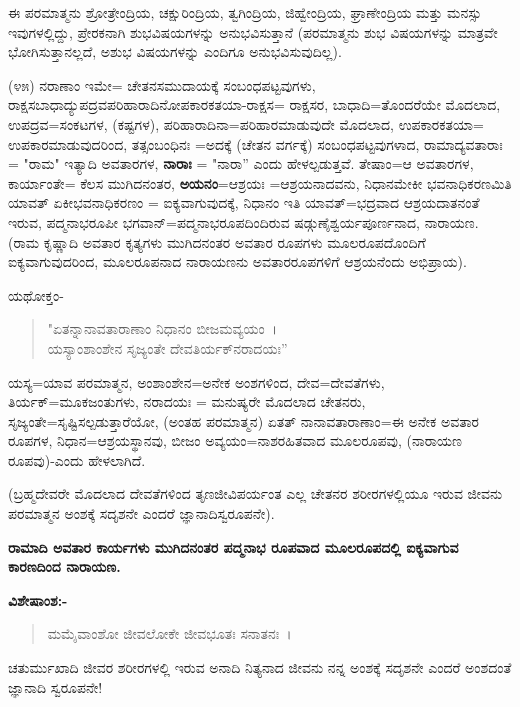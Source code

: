 
ಈ ಪರಮಾತ್ಮನು ಶ್ರೋತ್ರೇಂದ್ರಿಯ, ಚಕ್ಷುರಿಂದ್ರಿಯ, ತ್ವಗಿಂದ್ರಿಯ, ಜಿಹ್ವೇಂದ್ರಿಯ, ಘ್ರಾಣೇಂದ್ರಿಯ ಮತ್ತು ಮನಸ್ಸು ಇವುಗಳಲ್ಲಿದ್ದು, ಪ್ರೇರಕನಾಗಿ ಶುಭವಿಷಯಗಳನ್ನು ಅನುಭವಿಸುತ್ತಾನೆ (ಪರಮಾತ್ಮನು ಶುಭ ವಿಷಯಗಳನ್ನು ಮಾತ್ರವೇ ಭೋಗಿಸುತ್ತಾನಲ್ಲದೆ, ಅಶುಭ ವಿಷಯಗಳನ್ನು ಎಂದಿಗೂ ಅನುಭವಿಸುವುದಿಲ್ಲ).

(೪೫) ನರಾಣಾಂ ಇಮೇ= ಚೇತನಸಮುದಾಯಕ್ಕೆ ಸಂಬಂಧಪಟ್ಟವುಗಳು, ರಾಕ್ಷಸಬಾಧಾದ್ಯುಪದ್ರವಪರಿಹಾರಾದಿನೋಪಕಾರಕತಯಾ-ರಾಕ್ಷಸ= ರಾಕ್ಷಸರ, ಬಾಧಾದಿ=ತೊಂದರೆಯೇ ಮೊದಲಾದ, ಉಪದ್ರವ=ಸಂಕಟಗಳ, (ಕಷ್ಟಗಳ), ಪರಿಹಾರಾದಿನಾ=ಪರಿಹಾರಮಾಡುವುದೇ ಮೊದಲಾದ, ಉಪಕಾರಕತಯಾ= ಉಪಕಾರಮಾಡುವುದರಿಂದ, ತತ್ಸಂಬಂಧಿನಃ =ಅದಕ್ಕೆ (ಚೇತನ ವರ್ಗಕ್ಕೆ) ಸಂಬಂಧಪಟ್ಟವುಗಳಾದ, ರಾಮಾದ್ಯವತಾರಾಃ = "ರಾಮ" ಇತ್ಯಾದಿ ಅವತಾರಗಳ, \textbf{ನಾರಾಃ} = "ನಾರಾ'' ಎಂದು ಹೇಳಲ್ಪಡುತ್ತವೆ. ತೇಷಾಂ=ಆ ಅವತಾರಗಳ, ಕಾರ್ಯಾಂತೇ= ಕೆಲಸ ಮುಗಿದನಂತರ, \textbf{ಅಯನಂ}=ಆಶ್ರಯಃ =ಆಶ್ರಯನಾದವನು, ನಿಧಾನಮೇಕೀ ಭವನಾಧಿಕರಣಮಿತಿ ಯಾವತ್‌ ಏಕೀಭವನಾಧಿಕರಣಂ = ಐಕ್ಯವಾಗುವುದಕ್ಕೆ, ನಿಧಾನಂ ಇತಿ ಯಾವತ್=ಭದ್ರವಾದ ಆಶ್ರಯದಾತನಂತೆ ಇರುವ, ಪದ್ಮನಾಭರೂಪೀ ಭಗವಾನ್=ಪದ್ಮನಾಭರೂಪದಿಂದಿರುವ ಷಡ್ಗುಣೈಶ್ವರ್ಯಪೂರ್ಣನಾದ, ನಾರಾಯಣ. (ರಾಮ ಕೃಷ್ಣಾದಿ ಅವತಾರ ಕೃತ್ಯಗಳು ಮುಗಿದನಂತರ ಅವತಾರ ರೂಪಗಳು ಮೂಲರೂಪದೊಂದಿಗೆ ಐಕ್ಯವಾಗುವುದರಿಂದ, ಮೂಲರೂಪನಾದ ನಾರಾಯಣನು ಅವತಾರರೂಪಗಳಿಗೆ ಆಶ್ರಯನೆಂದು ಅಭಿಪ್ರಾಯ).

ಯಥೋಕ್ತಂ-

\begin{verse}
"ಏತನ್ನಾನಾವತಾರಾಣಾಂ ನಿಧಾನಂ ಬೀಜಮವ್ಯಯಂ~।\\ ಯಸ್ಯಾಂಶಾಂಶೇನ ಸೃಜ್ಯಂತೇ ದೇವತಿರ್ಯಕ್‌ನರಾದಯಃ''
\end{verse}

ಯಸ್ಯ=ಯಾವ ಪರಮಾತ್ಮನ, ಅಂಶಾಂಶೇನ=ಅನೇಕ ಅಂಶಗಳಿಂದ, ದೇವ=ದೇವತೆಗಳು, ತಿರ್ಯಕ್=ಮೂಕಜಂತುಗಳು, ನರಾದಯಃ = ಮನುಷ್ಯರೇ ಮೊದಲಾದ ಚೇತನರು, ಸೃಜ್ಯಂತೇ=ಸೃಷ್ಟಿಸಲ್ಪಡುತ್ತಾರೆಯೋ, (ಅಂತಹ ಪರಮಾತ್ಮನ) ಏತತ್ ನಾನಾವತಾರಾಣಾಂ=ಈ ಅನೇಕ ಅವತಾರ ರೂಪಗಳ, ನಿಧಾನ=ಆಶ್ರಯಸ್ಥಾನವು, ಬೀಜಂ ಅವ್ಯಯಂ=ನಾಶರಹಿತವಾದ ಮೂಲರೂಪವು, (ನಾರಾಯಣ ರೂಪವು)-ಎಂದು ಹೇಳಲಾಗಿದೆ.

(ಬ್ರಹ್ಮದೇವರೇ ಮೊದಲಾದ ದೇವತೆಗಳಿಂದ ತೃಣಜೀವಿಪರ್ಯಂತ ಎಲ್ಲ ಚೇತನರ ಶರೀರಗಳಲ್ಲಿಯೂ ಇರುವ ಜೀವನು ಪರಮಾತ್ಮನ ಅಂಶಕ್ಕೆ ಸದೃಶನೇ ಎಂದರೆ ಜ್ಞಾನಾದಿಸ್ವರೂಪನೇ).

\begin{center}
\textbf{ರಾಮಾದಿ ಅವತಾರ ಕಾರ್ಯಗಳು ಮುಗಿದನಂತರ ಪದ್ಮನಾಭ ರೂಪವಾದ ಮೂಲರೂಪದಲ್ಲಿ ಐಕ್ಯವಾಗುವ ಕಾರಣದಿಂದ ನಾರಾಯಣ.}
\end{center}

\noindent
\textbf{ವಿಶೇಷಾಂಶ:-}

\begin{verse}
ಮಮೈವಾಂಶೋ ಜೀವಲೋಕೇ ಜೀವಭೂತಃ ಸನಾತನಃ~।
\end{verse}


ಚತುರ್ಮುಖಾದಿ ಜೀವರ ಶರೀರಗಳಲ್ಲಿ ಇರುವ ಅನಾದಿ ನಿತ್ಯನಾದ ಜೀವನು ನನ್ನ ಅಂಶಕ್ಕೆ ಸದೃಶನೇ ಎಂದರೆ ಅಂಶದಂತೆ ಜ್ಞಾನಾದಿ ಸ್ವರೂಪನೇ!


